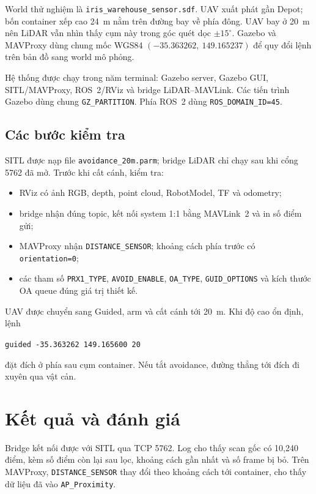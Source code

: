 \documentclass[11pt,a4paper]{article}
\begin{document}
World thử nghiệm là \texttt{iris\_warehouse\_sensor.sdf}. UAV xuất phát gần Depot; bốn container xếp cao 24~m nằm trên đường bay về phía đông. UAV bay ở 20~m nên LiDAR vẫn nhìn thấy cụm này trong góc quét dọc $\pm15^{\circ}$. Gazebo và MAVProxy dùng chung mốc WGS84 $(-35.363262,\ 149.165237)$ để quy đổi lệnh trên bản đồ sang world mô phỏng.

Hệ thống được chạy trong năm terminal: Gazebo server, Gazebo GUI, SITL/MAVProxy, ROS~2/RViz và bridge LiDAR--MAVLink. Các tiến trình Gazebo dùng chung \texttt{GZ\_PARTITION}. Phía ROS~2 dùng \texttt{ROS\_DOMAIN\_ID=45}.

\subsection{Các bước kiểm tra}

SITL được nạp file \texttt{avoidance\_20m.parm}; bridge LiDAR chỉ chạy sau khi cổng 5762 đã mở. Trước khi cất cánh, kiểm tra:

\begin{itemize}
  \item RViz có ảnh RGB, depth, point cloud, RobotModel, TF và odometry;
  \item bridge nhận đúng topic, kết nối system 1:1 bằng MAVLink~2 và in số điểm gửi;
  \item MAVProxy nhận \texttt{DISTANCE\_SENSOR}; khoảng cách phía trước có \texttt{orientation=0};
  \item các tham số \texttt{PRX1\_TYPE}, \texttt{AVOID\_ENABLE}, \texttt{OA\_TYPE}, \texttt{GUID\_OPTIONS} và kích thước OA queue đúng giá trị thiết kế.
\end{itemize}

UAV được chuyển sang Guided, arm và cất cánh tới 20~m. Khi độ cao ổn định, lệnh
\begin{center}
\texttt{guided -35.363262 149.165600 20}
\end{center}
đặt đích ở phía sau cụm container. Nếu tắt avoidance, đường thẳng tới đích đi xuyên qua vật cản.

\section{Kết quả và đánh giá}

Bridge kết nối được với SITL qua TCP 5762. Log cho thấy scan gốc có 10,240 điểm, kèm số điểm còn lại sau lọc, khoảng cách gần nhất và số frame bị bỏ. Trên MAVProxy, \texttt{DISTANCE\_SENSOR} thay đổi theo khoảng cách tới container, cho thấy dữ liệu đã vào \texttt{AP\_Proximity}.
\end{document}
